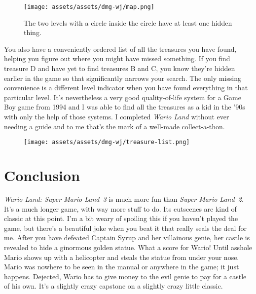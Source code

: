 \documentclass{book}
\begin{document}
\begin{figure}[hbt]
\vskip 10pt
\centering \texttt{[image: assets/assets/dmg-wj/map.png]}\par\pagetwodescription The two levels with a circle inside the circle have at least one hidden thing.
\vskip 6pt
\end{figure}

You also have a conveniently ordered list of all the treasures you have found, helping you figure out where you might have missed something. If you find treasure D and have yet to find treasures B and C, you know they’re hidden earlier in the game so that significantly narrows your search. The only missing convenience is a different level indicator when you have found everything in that particular level. It’s nevertheless a very good quality-of-life system for a Game Boy game from 1994 and I was able to find all the treasures as a kid in the ’90s with only the help of those systems. I completed \emph{Wario Land} without ever needing a guide and to me that’s the mark of a well-made collect-a-thon.

\begin{figure}[hbt]
\vskip 10pt
\centering \texttt{[image: assets/assets/dmg-wj/treasure-list.png]}
\vskip 6pt
\end{figure}

\FloatBarrier\needspace{10mm}\section*{Conclusion}\nopagebreak[4]

\emph{Wario Land: Super Mario Land~3} is much more fun than \emph{Super Mario Land~2}. It’s a much longer game, with way more stuff to do. Its cutscenes are kind of classic at this point. I’m a bit weary of spoiling this if you haven’t played the game, but there’s a beautiful joke when you beat it that really seals the deal for me. After you have defeated Captain Syrup and her villainous genie, her castle is revealed to hide a ginormous golden statue. What a score for Wario! Until asshole Mario shows up with a helicopter and steals the statue from under your nose. Mario was nowhere to be seen in the manual or anywhere in the game; it just happens. Dejected, Wario has to give money to the evil genie to pay for a castle of his own. It’s a slightly crazy capstone on a slightly crazy little classic.


\endgroup 
\end{document}
